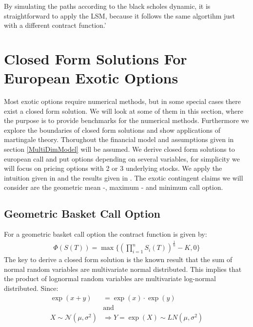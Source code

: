 By simulating the paths according to the black scholes dynamic, it is straightforward to apply the LSM, because it follows the same algortihm just with a different contract function.'

\newpage


\section{Closed Form Solutions For European Exotic Options}\label{ExoticEuro}
Most exotic options require numerical methods, but in some special cases there exist a closed form solution. We will look at some of them in this section, where the purpose is to provide benchmarks for the numerical methods. Furthermore we explore the boundaries of closed form solutions and show applications of martingale theory. Thorughout the financial model and assumptions given in section \ref{MultiDimModel} will be assumed. We derive closed form solutions to european call and put options depending on several variables, for simplicity we will focus on pricing options with 2 or 3 underlying stocks. We apply the intuition given in \parencite{Johnson87} and the results given in \parencite{Ouwehand2006}. The exotic contingent claims we will consider are the geometric mean -, maximum - and minimum call option.

\subsection{Geometric Basket Call Option}\label{GeoBasket}
For a geometric basket call option the contract function is given by:
\begin{align*}
\Phi(S(T))=\max\{ (\prod_{i=1}^{n} S_i(T))^{\frac{1}{n}}-K,0 \}
\end{align*}
The key to  derive a closed form solution is the known result that the sum of normal random variables are multivariate normal distributed.
This implies that the product of lognormal random variables are multivariate log-normal distributed. Since: 
\begin{equation*}
\begin{split}
\exp(x+y)&=\exp(x)\cdot \exp(y) \\
& \text{and}\\
 X \sim \mathcal{N}(\mu,\sigma^2) & \Rightarrow Y = \exp(X)\sim LN(\mu, \sigma^2)
\end{split}
\end{equation*}

